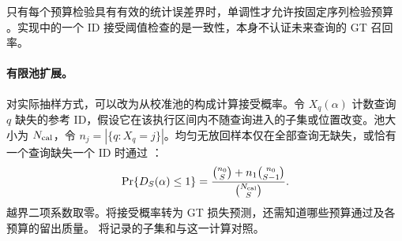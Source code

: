 只有每个预算检验具有有效的统计误差界时，单调性才允许按固定序列检验预算 \cite{learn_then_test}。实现中的一个 ID 接受阈值检查的是一致性，本身不认证未来查询的 GT 召回率。

\paragraph{有限池扩展。}
对实际抽样方式，可以改为从校准池的构成计算接受概率。令 $X_q(\alpha)$ 计数查询 $q$ 缺失的参考 ID，假设它在该执行区间内不随查询进入的子集或位置改变。池大小为 $N_{\rm cal}$，令 $n_j=|\{q:X_q=j\}|$。均匀无放回样本仅在全部查询无缺失，或恰有一个查询缺失一个 ID 时通过 \cite{nist_hypergeometric}：
\begin{equation}
 \Pr\{D_S(\alpha)\leq1\}
 =\frac{\binom{n_0}{S}+n_1\binom{n_0}{S-1}}{\binom{N_{\rm cal}}{S}}.
 \label{eq:6-finite-pool}
\end{equation}
越界二项系数取零。将接受概率转为 GT 损失预测，还需知道哪些预算通过及各预算的留出质量。 将记录的子集和与这一计算对照。
